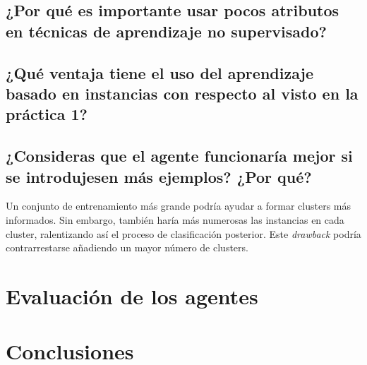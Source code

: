\documentclass[12pt]{article}
\begin{document}
\subsection{¿Por qué es importante usar pocos atributos en técnicas de aprendizaje no supervisado?}


\subsection{¿Qué ventaja tiene el uso del aprendizaje basado en instancias con respecto al visto en la práctica 1?}


\subsection{¿Consideras que el agente funcionaría mejor si se introdujesen más ejemplos? ¿Por qué?}

Un conjunto de entrenamiento más grande podría ayudar a formar clusters más informados. Sin embargo, también haría más numerosas las instancias en cada cluster, ralentizando así el proceso de clasificación posterior. Este \emph{drawback} podría contrarrestarse añadiendo un mayor número de clusters.

\section{Evaluación de los agentes}





\newpage
\section{Conclusiones}
\end{document}

